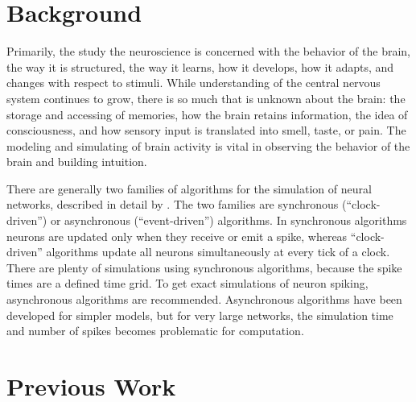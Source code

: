 \documentclass[a4paper]{article}
\begin{document}
\section{Background}
Primarily, the study the neuroscience is concerned with the behavior of the brain, the way it is structured, the way it learns, how it develops, how it adapts, and changes with respect to stimuli. While understanding of the central nervous system continues to grow, there is so much that is unknown about the brain: the storage and accessing of memories, how the brain retains information, the idea of consciousness, and how sensory input is translated into smell, taste, or pain. The modeling and simulating of brain activity is vital in observing the behavior of the brain and building intuition.

There are generally two families of algorithms for the simulation of neural networks, described in detail by \cite{spike}. The two families are synchronous (“clock-driven”) or asynchronous (“event-driven”) algorithms. In synchronous algorithms neurons are updated only when they receive or emit a spike, whereas “clock-driven” algorithms update all neurons simultaneously at every tick of a clock. There are plenty of simulations using synchronous algorithms, because the spike times are a defined time grid. To get exact simulations of neuron spiking, asynchronous algorithms are recommended. Asynchronous algorithms have been developed for simpler models, but for very large networks, the simulation time and number of spikes becomes problematic for computation.

\section{Previous Work}
%
\end{document}
